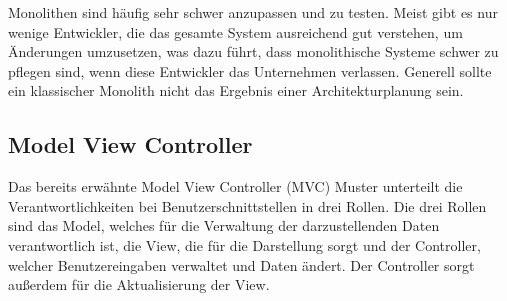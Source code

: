 Monolithen sind häufig sehr schwer anzupassen und zu testen.
Meist gibt es nur wenige Entwickler, die das gesamte System ausreichend gut verstehen, um Änderungen umzusetzen, was dazu führt, dass monolithische Systeme schwer zu pflegen sind, wenn diese Entwickler das Unternehmen verlassen.
Generell sollte ein klassischer Monolith nicht das Ergebnis einer Architekturplanung sein.~\cite{softArchGrundl}

\subsection{Model View Controller} %
\label{sub:Model_View_Controller}
Das bereits erwähnte Model View Controller (MVC) Muster unterteilt die Verantwortlichkeiten bei Benutzerschnittstellen in drei Rollen.
Die drei Rollen sind das Model, welches für die Verwaltung der darzustellenden Daten verantwortlich ist, die View, die für die Darstellung sorgt und der Controller, welcher Benutzereingaben verwaltet und Daten ändert.
Der Controller sorgt außerdem für die Aktualisierung der View.\\
